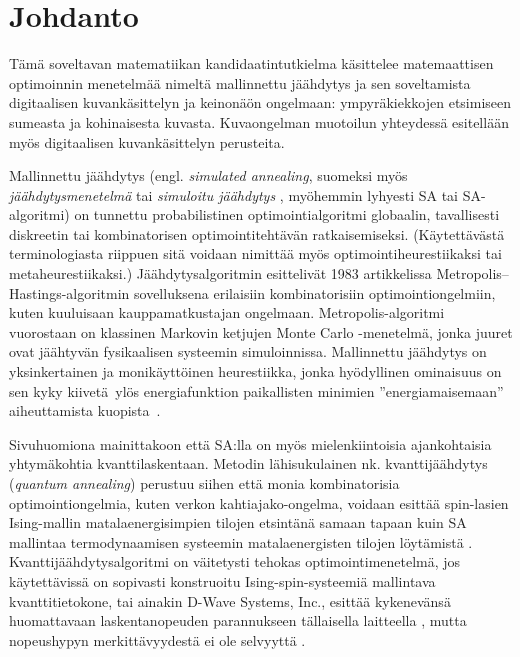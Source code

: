 \chapter{Johdanto}
\label{cha:johdanto}


Tämä soveltavan matematiikan kandidaatintutkielma käsittelee matemaattisen optimoinnin menetelmää nimeltä mallinnettu jäähdytys ja sen soveltamista digitaalisen kuvankäsittelyn ja keinonäön ongelmaan: ympyräkiekkojen etsimiseen sumeasta ja kohinaisesta kuvasta.
Kuvaongelman muotoilun yhteydessä esitellään myös digitaalisen kuvankäsittelyn perusteita.

Mallinnettu jäähdytys (engl. \emph{simulated annealing}, suomeksi myös \emph{jäähdytysmenetelmä} tai \emph{simuloitu jäähdytys} \cite[suomennokset ks.][]{haataja93}, myöhemmin lyhyesti SA tai SA-algoritmi) on tunnettu probabilistinen optimointialgoritmi globaalin, tavallisesti diskreetin tai kombinatorisen optimointitehtävän ratkaisemiseksi.
(Käytettävästä terminologiasta riippuen sitä voidaan nimittää myös optimointiheurestiikaksi tai metaheurestiikaksi.)
Jäähdytysalgoritmin esittelivät \citeauthor*{kirkpatrick83} 1983 artikkelissa \cite{kirkpatrick83} Metropolis--Hastings-algoritmin sovelluksena erilaisiin kombinatorisiin optimointiongelmiin, kuten kuuluisaan kauppamatkustajan ongelmaan.
Metropolis-algoritmi vuorostaan on klassinen Markovin ketjujen Monte Carlo -menetelmä, jonka juuret ovat jäähtyvän fysikaalisen systeemin simuloinnissa.
Mallinnettu jäähdytys on yksinkertainen ja monikäyttöinen heurestiikka,
jonka hyödyllinen ominaisuus on sen kyky kiivetä ylös energiafunktion paikallisten minimien ''energiamaisemaan'' aiheuttamista kuopista~\cite{salamonetal}.

Sivuhuomiona mainittakoon että SA:lla on myös mielenkiintoisia ajankohtaisia yhtymäkohtia kvanttilaskentaan.
Metodin lähisukulainen nk. kvanttijäähdytys (\emph{quantum annealing}) perustuu siihen että monia kombinatorisia optimointiongelmia,
kuten verkon kahtiajako-ongelma, voidaan esittää spin-lasien Ising-mallin matalaenergisimpien tilojen etsintänä samaan tapaan kuin SA mallintaa termodynaamisen systeemin matalaenergisten tilojen löytämistä \cites[luku 4.5]{laarhoven}[]{johnson11dwave}.
Kvanttijäähdytysalgoritmi on väitetysti tehokas optimointimenetelmä, jos käytettävissä on sopivasti konstruoitu Ising-spin-systeemiä mallintava kvanttitietokone,
tai ainakin D-Wave Systems, Inc., esittää kykenevänsä huomattavaan laskentanopeuden parannukseen tällaisella laitteella \cite{johnson11dwave, denchev2015},
mutta nopeushypyn merkittävyydestä ei ole selvyyttä \cite{troyer2015}.

